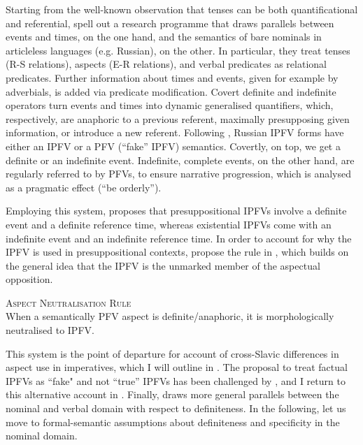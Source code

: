 \documentclass[output=paper,colorlinks,citecolor=brown]{langscibook}
\begin{document}
Starting from the well-known observation that tenses can be both quantificational and referential, \citet{gronnstechow16} spell out a research programme that draws parallels between events and times, on the one hand, and the semantics of bare nominals in articleless languages (e.g. Russian), on the other. In particular, they treat tenses (R-S relations), aspects (E-R relations), and verbal predicates as relational predicates. Further information about times and events, given for example by adverbials, is added via predicate modification. Covert definite and indefinite operators turn events and times into dynamic generalised quantifiers, which, respectively, are anaphoric to a previous referent, maximally presupposing given information, or introduce a new referent. Following \citet{gronndiss,gronn15}, Russian IPFV forms have either an IPFV or a PFV (``fake'' IPFV) semantics. Covertly, on top, we get a definite or an indefinite event. Indefinite, complete events, on the other hand, are regularly referred to by PFVs, to ensure narrative progression, which is analysed as a pragmatic effect (``be orderly'').

Employing this system, \citet{gronn15} proposes that presuppositional IPFVs involve a definite event and a definite reference time, whereas existential IPFVs come with an indefinite event and an indefinite reference time. In order to account for why the IPFV is used in presuppositional contexts, \citet{gronnstechow16} propose the rule in , which builds on the general idea that the IPFV is the unmarked member of the aspectual opposition.

\eanoraggedright \textsc{Aspect Neutralisation Rule} \citep[see][]{gronnstechow16}\label{ex:aspneugst}\\
When a semantically PFV aspect is definite/anaphoric, it is morphologically neutralised to IPFV. 
\z 

\noindent This system is the point of departure for  account of cross-Slavic differences in aspect use in imperatives, which I will outline in . The proposal to treat factual IPFVs as ``fake" and not ``true'' IPFVs has been challenged by \citet{gehrketrueipf}, and I return to this alternative account in . Finally,  draws more general parallels between the nominal and verbal domain with respect to definiteness. In the following, let us move to formal-semantic assumptions about definiteness and specificity in the nominal domain. 
\end{document}
